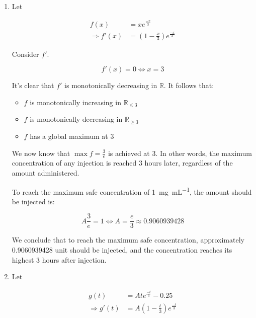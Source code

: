 \documentclass[../../../../Assignments]{subfiles}
\begin{document}
\begin{solution}
    \begin{enumerate}[label = \alph*)]
        \item Let

            \begin{align*}
                             f(x) &= xe^{\frac{-x}{3}} \\
                \Rightarrow f'(x) &= \left(1 - \frac{x}{3}\right) e^{\frac{-x}{3}}
            \end{align*}

            Consider \(f'\).

            \[f'(x) = 0 \iff x = 3\]

            It's clear that \(f'\) is monotonically decreasing in
            \(\mathbb{R}\). It follows that:

            \begin{itemize}
                \item \(f\) is monotonically increasing in \(\mathbb{R}_{\leq 3}\)
                \item \(f\) is monotonically decreasing in \(\mathbb{R}_{\geq 3}\)
                \item \(f\) has a global maximum at \num{3}
            \end{itemize}

            We now know that \(\max{f} = \frac{3}{e}\) is achieved at \num{3}.
            In other words, the maximum concentration of any injection is
            reached \num{3} hours later, regardless of the amount administered.

            To reach the maximum safe concentration of
            \qty{1}{\milli\gram\per\milli\liter}, the amount should be injected
            is:

            \[A \frac{3}{e} = 1 \iff A = \frac{e}{3} \approx \num{0.9060939428}\]

            We conclude that to reach the maximum safe concentration,
            approximately \num{0.9060939428} unit should be injected, and the
            concentration reaches its highest 3 hours after injection.

        \item Let

            \begin{align*}
                             g(t) &= Ate^{\frac{-t}{3}} - 0.25 \\
                \Rightarrow g'(t) &= A\left(1 - \frac{t}{3}\right) e^{\frac{-t}{3}}
            \end{align*}


\end{enumerate}
\end{solution}
\end{document}
